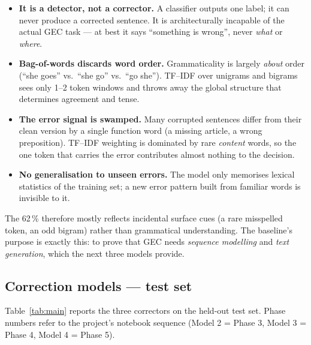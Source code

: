 \documentclass[11pt,a4paper]{article}
\begin{document}
\begin{itemize}[noitemsep]
  \item \textbf{It is a detector, not a corrector.} A classifier outputs one
        label; it can never produce a corrected sentence. It is architecturally
        incapable of the actual GEC task --- at best it says ``something is
        wrong'', never \emph{what} or \emph{where}.
  \item \textbf{Bag-of-words discards word order.} Grammaticality is largely
        \emph{about} order (``she goes'' vs.\ ``she go'' vs.\ ``go she'').
        TF--IDF over unigrams and bigrams sees only 1--2 token windows and
        throws away the global structure that determines agreement and tense.
  \item \textbf{The error signal is swamped.} Many corrupted sentences differ
        from their clean version by a single function word (a missing article,
        a wrong preposition). TF--IDF weighting is dominated by rare
        \emph{content} words, so the one token that carries the error
        contributes almost nothing to the decision.
  \item \textbf{No generalisation to unseen errors.} The model only memorises
        lexical statistics of the training set; a new error pattern built from
        familiar words is invisible to it.
\end{itemize}

The 62\,\% therefore mostly reflects incidental surface cues (a rare misspelled
token, an odd bigram) rather than grammatical understanding. The baseline's
purpose is exactly this: to prove that GEC needs \emph{sequence modelling} and
\emph{text generation}, which the next three models provide.

\subsection{Correction models --- test set}
Table~\ref{tab:main} reports the three correctors on the held-out test set.
Phase numbers refer to the project's notebook sequence (Model 2 = Phase 3,
Model 3 = Phase 4, Model 4 = Phase 5).
\end{document}
